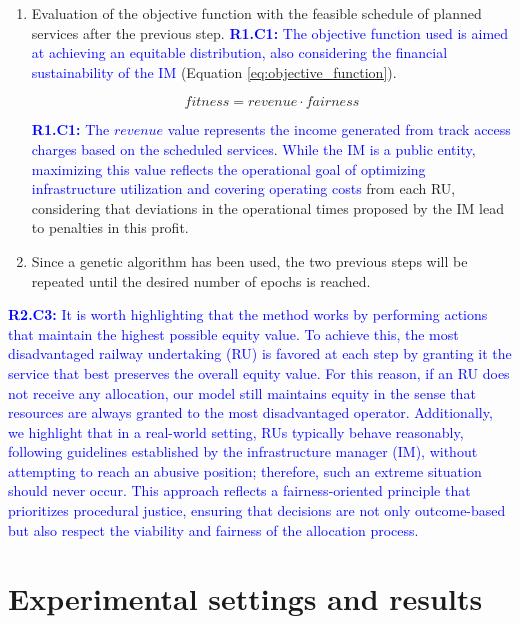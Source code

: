 \documentclass[preprint,12pt]{elsarticle}
\begin{document}
\begin{enumerate}
    \item Evaluation of the objective function with the feasible schedule of planned services after the previous step. \textcolor{blue}{\textbf{R1.C1:} The objective function used is aimed at achieving an equitable distribution, also considering the financial sustainability of the \gls{IM}} (Equation \ref{eq:objective_function}).

    \begin{equation}
        fitness = revenue \cdot fairness
        \label{eq:objective_function}
    \end{equation}

    \textcolor{blue}{\textbf{R1.C1:} The $revenue$ value represents the income generated from track access charges based on the scheduled services. While the IM is a public entity, maximizing this value reflects the operational goal of optimizing infrastructure utilization and covering operating costs} from each \gls{RU}, considering that deviations in the operational times proposed by the \gls{IM} lead to penalties in this profit.
    
    \item Since a genetic algorithm has been used, the two previous steps will be repeated until the desired number of epochs is reached. 
\end{enumerate}

\textcolor{blue}{\textbf{R2.C3:} It is worth highlighting that the method works by performing actions that maintain the highest possible equity value. To achieve this, the most disadvantaged railway undertaking (RU) is favored at each step by granting it the service that best preserves the overall equity value. For this reason, if an RU does not receive any allocation, our model still maintains equity in the sense that resources are always granted to the most disadvantaged operator. Additionally, we highlight that in a real-world setting, RUs typically behave reasonably, following guidelines established by the infrastructure manager (IM), without attempting to reach an abusive position; therefore, such an extreme situation should never occur. This approach reflects a fairness-oriented principle that prioritizes procedural justice, ensuring that decisions are not only outcome-based but also respect the viability and fairness of the allocation process.}

\section{Experimental settings and results}\label{sec:Tests}
\end{document}
